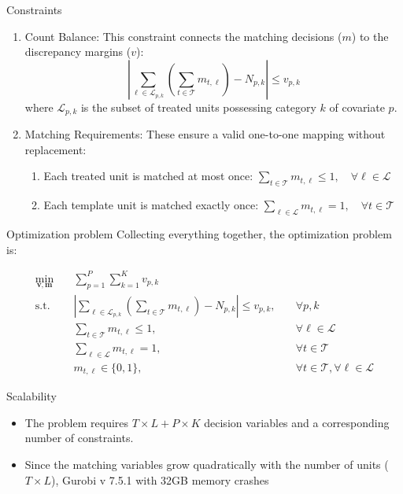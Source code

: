 \documentclass{beamer}
\begin{document}
\begin{frame}{Constraints}
\begin{enumerate}
	\item Count Balance: This constraint connects the matching decisions ($m$) to the discrepancy margins ($v$):
    $$| \sum_{\ell \in \mathcal{L}_{p,k}} \left( \sum_{t \in \mathcal{T}} m_{t,\ell} \right) - N_{p,k} | \leq v_{p,k}$$
    where $\mathcal{L}_{p,k}$ is the subset of treated units possessing category $k$ of covariate $p$.
\item  Matching Requirements: These ensure a valid one-to-one mapping without replacement:
\begin{enumerate}
\item  Each treated unit is matched at most once: $\sum_{t \in \mathcal{T}} m_{t,\ell} \leq 1, \quad \forall \ell \in \mathcal{L}$
\item Each template unit is matched exactly once: $\sum_{\ell \in \mathcal{L}} m_{t,\ell} = 1, \quad \forall t \in \mathcal{T}$	

\end{enumerate}
    \end{enumerate}

\end{frame}


\begin{frame}{Optimization problem}
	Collecting everything together, the optimization problem is:


$$
\begin{aligned}
\min_{\mathbf{v}, \mathbf{m}} \quad & \sum_{p=1}^{P} \sum_{k=1}^{K} v_{p,k} \\
\text{s.t.} \quad & \left| \sum_{\ell \in \mathcal{L}_{p,k}} \left( \sum_{t \in \mathcal{T}} m_{t,\ell} \right) - N_{p,k} \right| \leq v_{p,k}, \quad & \forall p ,k \\
& \sum_{t \in \mathcal{T}} m_{t,\ell} \leq 1, \quad & \forall \ell \in \mathcal{L} \\
& \sum_{\ell \in \mathcal{L}} m_{t,\ell} = 1, \quad & \forall t \in \mathcal{T} \\
& m_{t,\ell} \in \{0, 1\}, \quad & \forall t \in \mathcal{T}, \forall \ell \in \mathcal{L}
\end{aligned}
$$
\end{frame}


\begin{frame}{Scalability}
\begin{itemize}
	\item The problem requires $T \times L + P \times K$ decision variables and a corresponding number of constraints.
	\item Since the matching variables grow quadratically with the number of units ($T \times L$), Gurobi v 7.5.1 with 32GB memory crashes
\end{itemize} 
\end{frame}
\end{document}
